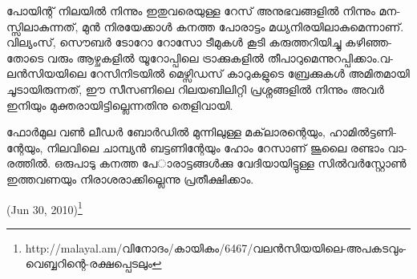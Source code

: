 ­പോ­യി­ന്റ് നി­ല­യില്‍ നി­ന്നും ഇതു­വ­രെ­യു­ള്ള റേ­സ് അനു­ഭ­വ­ങ്ങ­ളില്‍ നി­ന്നും മന­സ്സി­ലാ­കു­ന്ന­ത്, മുന്‍ നി­ര­യേ­ക്കാള്‍ കന­ത്ത പോ­രാ­ട്ടം
 മധ്യ­നി­ര­യി­ലാ­കു­മെ­ന്നാ­ണ്. വി­ല്യം­സ്, ­സൌ­ബര്‍ ­ടോ­റോ റോ­സോ­ ടീ­മു­കള്‍ കൂ­ടി കരു­ത്ത­റി­യി­ച്ചു കഴി­ഞ്ഞ­തോ­ടെ വരും ആഴ്ച­ക­ളില്‍ 
 യൂ­റോ­പ്പി­ലെ ട്രാ­ക്കു­ക­ളില്‍ തീ­പാ­റു­മെ­ന്നു­റ­പ്പി­ക്കാം­.­വ­ലന്‍­സി­യ­യി­ലെ റേ­സി­നി­ട­യില്‍ ­മെ­ഴ്സി­ഡ­സ് കാ­റു­ക­ളു­ടെ ബ്രേ­ക്കു­കള്‍ അമി­ത­മാ­യി 
 ചൂ­ടാ­യി­രു­ന്ന­ത്, ഈ സീ­സ­ണി­ലെ റി­ല­യ­ബി­ലി­റ്റി പ്ര­ശ്ന­ങ്ങ­ളില്‍ നി­ന്നും അവര്‍ ഇനി­യും മു­ക്ത­രാ­യി­ട്ടി­ല്ലെ­ന്ന­തി­നു തെ­ളി­വാ­യി­.

­ഫോര്‍­മുല വണ്‍ ലീ­ഡര്‍ ബോര്‍­ഡില്‍ മു­ന്നി­ലു­ള്ള മക്‌­ലാ­ര­ന്റെ­യും, ഹാ­മില്‍­ട്ട­ണി­ന്റേ­യും, നി­ല­വി­ലെ ചാ­മ്പ്യന്‍ ബട്ട­ണി­ന്റേ­യും ഹോം 
റേ­സാ­ണ് ജൂ­ലൈ രണ്ടാം വാ­ര­ത്തില്‍. ഒരു­പാ­ടു കന­ത്ത പേ­ാ­രാ­ട്ട­ങ്ങള്‍­ക്കു വേ­ദി­യാ­യി­ട്ടു­ള്ള ­സില്‍­വര്‍­സ്റ്റോണ്‍ ഇത്ത­വ­ണ­യും 
നി­രാ­ശ­രാ­ക്കി­ല്ലെ­ന്നു പ്ര­തീ­ക്ഷി­ക്കാം­.

(Jun 30, 2010)\footnote{http://malayal.am/വിനോദം/കായികം/6467/വലന്‍സിയയിലെ-അപകടവും-വെബ്ബറിന്റെ-രക്ഷപ്പെടലും}
\newpage
